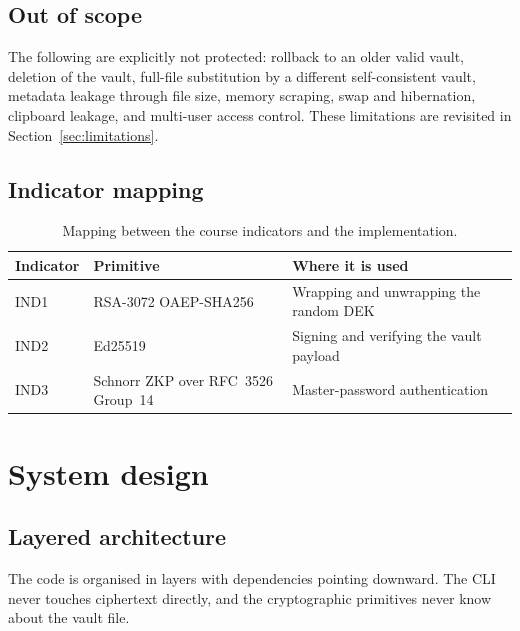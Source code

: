 \documentclass[11pt,a4paper]{article}
\begin{document}
\subsection{Out of scope}

The following are explicitly not protected: rollback to an older valid vault,
deletion of the vault, full-file substitution by a different self-consistent
vault, metadata leakage through file size, memory scraping, swap and
hibernation, clipboard leakage, and multi-user access control. These limitations
are revisited in Section~\ref{sec:limitations}.

\subsection{Indicator mapping}

\begin{table}[htbp]
\centering
\small
\begin{tabular}{@{}lll@{}}
\toprule
\textbf{Indicator} & \textbf{Primitive} & \textbf{Where it is used} \\
\midrule
IND1 & RSA-3072 OAEP-SHA256 & Wrapping and unwrapping the random DEK \\
IND2 & Ed25519 & Signing and verifying the vault payload \\
IND3 & Schnorr ZKP over RFC~3526 Group~14 & Master-password authentication \\
\bottomrule
\end{tabular}
\caption{Mapping between the course indicators and the implementation.}
\label{tab:indicators}
\end{table}

\section{System design}\label{sec:design}

\subsection{Layered architecture}

The code is organised in layers with dependencies pointing downward. The CLI
never touches ciphertext directly, and the cryptographic primitives never know
about the vault file.
\end{document}
